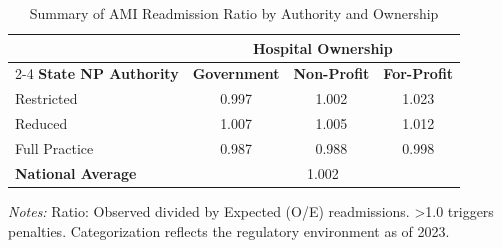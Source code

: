 \begin{table}[htbp]
    \centering
    \caption{Summary of AMI Readmission Ratio by Authority and Ownership}
    \label{tab:rrp_excess_ratio_ami_own}
    \vspace{0.2cm}
    \begin{tabular}{lccc}
        \toprule
        & \multicolumn{3}{c}{\textbf{Hospital Ownership}} \\
        \cmidrule(lr){2-4}
        \textbf{State NP Authority} & \textbf{Government} & \textbf{Non-Profit} & \textbf{For-Profit} \\
        \midrule
        Restricted & 0.997 & 1.002 & 1.023 \\
        Reduced & 1.007 & 1.005 & 1.012 \\
        Full Practice & 0.987 & 0.988 & 0.998 \\
        \midrule
        \textbf{National Average} & \multicolumn{3}{c}{1.002} \\
        \bottomrule
    \end{tabular}
    \vspace{0.1cm}
    \begin{minipage}{0.85\textwidth}
        \footnotesize \textit{Notes:} Ratio: Observed divided by Expected (O/E) readmissions. >1.0 triggers penalties. Categorization reflects the regulatory environment as of 2023.
    \end{minipage}
\end{table}